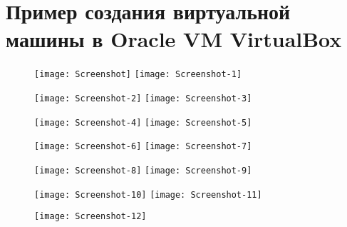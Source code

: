 \section{Пример создания виртуальной машины в Oracle VM VirtualBox} \label{pril:a}

\begin{figure}[ht]
    \centering
	\texttt{[image: Screenshot]}
	\texttt{[image: Screenshot-1]}
\end{figure}

\begin{figure}[ht]
    \centering
	\texttt{[image: Screenshot-2]}
	\texttt{[image: Screenshot-3]}
\end{figure}

\begin{figure}[ht]
    \centering
	\texttt{[image: Screenshot-4]}
	\texttt{[image: Screenshot-5]}
\end{figure}

\begin{figure}[ht]
    \centering
	\texttt{[image: Screenshot-6]}
	\texttt{[image: Screenshot-7]}
\end{figure}

\begin{figure}[ht]
    \centering
	\texttt{[image: Screenshot-8]}
	\texttt{[image: Screenshot-9]}
\end{figure}

\begin{figure}[ht]
    \centering
	\texttt{[image: Screenshot-10]}
	\texttt{[image: Screenshot-11]}
\end{figure}

\begin{figure}[ht]
    \centering
	\texttt{[image: Screenshot-12]}
\end{figure}

\clearpage
